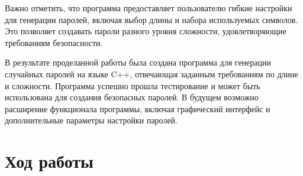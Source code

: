 \documentclass[12pt,a4paper]{scrartcl}
\begin{document}
Важно отметить, что программа предоставляет пользователю гибкие настройки для генерации паролей, включая выбор длины и набора используемых символов. Это позволяет создавать пароли разного уровня сложности, удовлетворяющие требованиям безопасности.

В результате проделанной работы была создана программа для генерации случайных паролей на языке C++, отвечающая заданным требованиям по длине и сложности. Программа успешно прошла тестирование и может быть использована для создания безопасных паролей. В будущем возможно расширение функционала программы, включая графический интерфейс и дополнительные параметры настройки паролей.


\section{Ход работы}
\end{document}
